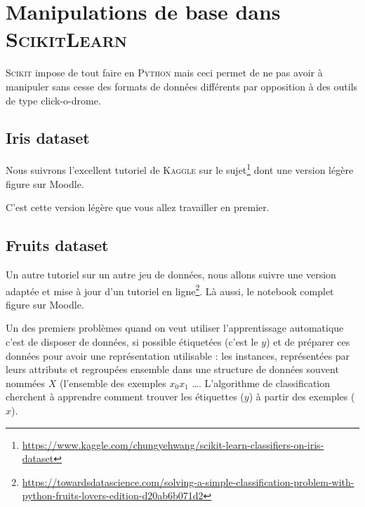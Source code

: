 \section{Manipulations de base dans \textsc{ScikitLearn}}


 \textsc{Scikit} impose de tout faire en \textsc{Python} mais ceci permet de ne pas avoir à manipuler sans cesse des formats de données différents par opposition à des outils de type click-o-drome. %


\subsection{Iris dataset}

 Nous suivrons l'excellent tutoriel de \textsc{Kaggle} sur le sujet\footnote{\url{https://www.kaggle.com/chungyehwang/scikit-learn-classifiers-on-iris-dataset}} dont une version légère figure sur Moodle.

 C'est cette version légère que vous allez travailler en premier.

\subsection{Fruits dataset}

 Un autre tutoriel sur un autre jeu de données, nous allons suivre une version adaptée et mise à jour d'un tutoriel en ligne\footnote{\url{https://towardsdatascience.com/solving-a-simple-classification-problem-with-python-fruits-lovers-edition-d20ab6b071d2}}. Là aussi, le notebook complet figure sur Moodle.

 Un des premiers problèmes quand on veut utiliser l'apprentissage automatique c'est de disposer de données, si possible étiquetées (c'est le $y$) et de préparer ces données pour avoir une représentation utilisable : les instances, représentées par leurs attributs et regroupées ensemble dans une structure de données souvent nommées $X$ (l'ensemble des exemples $x_0 x_1$ \dots.
 L'algorithme de classification cherchent à apprendre comment trouver les étiquettes ($y$) à partir des exemples ($x$).

